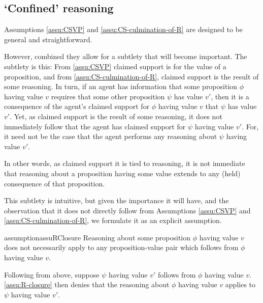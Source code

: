 \subsection{`Confined' reasoning}
\label{sec:no-closure}

\begin{note}
  Assumptions \ref{assu:CSVP} and \ref{assu:CS-culmination-of-R} are designed to be general and straightforward.

  However, combined they allow for a subtlety that will become important.
  The subtlety is this:
  From \autoref{assu:CSVP} claimed support is for the value of a proposition, and from \autoref{assu:CS-culmination-of-R}, claimed support is the result of some reasoning.
  In turn, if an agent has information that some proposition \(\phi\) having value \(v\) requires that some other proposition \(\psi\) has value \(v'\), then it is a consequence of the agent's claimed support for \(\phi\) having value \(v\) that \(\psi\) has value \(v'\).
  Yet, as claimed support is the result of some reasoning, it does not immediately follow that the agent has claimed support for \(\psi\) having value \(v'\).
  For, it need not be the case that the agent performs any reasoning about \(\psi\) having value \(v'\).

  In other words, as claimed support it is tied to reasoning, it is not immediate that reasoning about a proposition having some value extends to any (held) consequence of that proposition.

  This subtlety is intuitive, but given the importance it will have, and the observation that it does not directly follow from Assumptions \ref{assu:CSVP} and \ref{assu:CS-culmination-of-R}, we formulate it as an explicit assumption.
\end{note}

\begin{note}
  \begin{restatable}{assumption}{assuRClosure}\label{assu:R-closure}
    Reasoning about some proposition \(\phi\) having value \(v\) does not necessarily apply to any proposition-value pair which follows from \(\phi\) having value \(v\).
  \end{restatable}

  Following from above, suppose \(\psi\) having value \(v'\) follows from \(\phi\) having value \(v\).
  \autoref{assu:R-closure} then denies that the reasoning about \(\phi\) having value \(v\) applies to \(\psi\) having value \(v'\).
\end{note}

